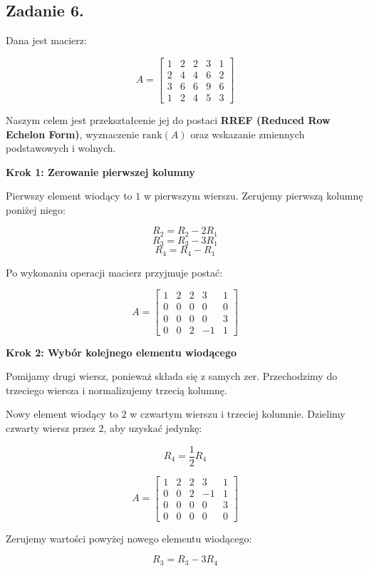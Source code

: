 \documentclass{article}
\begin{document}
\subsection{Zadanie 6.}

Dana jest macierz:

\[
A =
\begin{bmatrix}
1 & 2 & 2 & 3 & 1 \\
2 & 4 & 4 & 6 & 2 \\
3 & 6 & 6 & 9 & 6 \\
1 & 2 & 4 & 5 & 3
\end{bmatrix}
\]

Naszym celem jest przekształcenie jej do postaci \textbf{RREF (Reduced Row Echelon Form)}, wyznaczenie $\text{rank}(A)$ oraz wskazanie zmiennych podstawowych i wolnych.

\textbf{Krok 1: Zerowanie pierwszej kolumny}

Pierwszy element wiodący to $1$ w pierwszym wierszu. Zerujemy pierwszą kolumnę poniżej niego:

\[
R_2 = R_2 - 2R_1
\]
\[
R_3 = R_3 - 3R_1
\]
\[
R_4 = R_4 - R_1
\]

Po wykonaniu operacji macierz przyjmuje postać:

\[
A =
\begin{bmatrix}
1 & 2 & 2 & 3 & 1 \\
0 & 0 & 0 & 0 & 0 \\
0 & 0 & 0 & 0 & 3 \\
0 & 0 & 2 & -1 & 1
\end{bmatrix}
\]

\textbf{Krok 2: Wybór kolejnego elementu wiodącego}

Pomijamy drugi wiersz, ponieważ składa się z samych zer. Przechodzimy do trzeciego wiersza i normalizujemy trzecią kolumnę.

Nowy element wiodący to $2$ w czwartym wierszu i trzeciej kolumnie. Dzielimy czwarty wiersz przez $2$, aby uzyskać jedynkę:

\[
R_4 = \frac{1}{2} R_4
\]

\[
A =
\begin{bmatrix}
1 & 2 & 2 & 3 & 1 \\
0 & 0 & 2 & -1 & 1 \\
0 & 0 & 0 & 0 & 3 \\
0 & 0 & 0 & 0 & 0
\end{bmatrix}
\]

Zerujemy wartości powyżej nowego elementu wiodącego:

\[
R_3 = R_3 - 3R_4
\]
\end{document}
